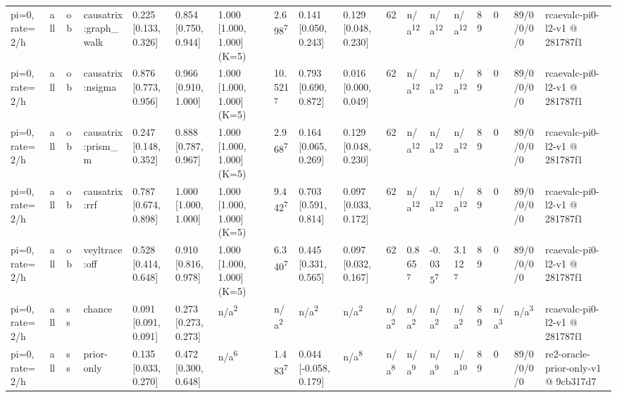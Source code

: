 \begin{table}[t]
\begin{tabular}{llllllllllllllllll}
pi=0, rate=2/h & all & ob & causatrix:graph\_walk & 0.225 [0.133, 0.326] & 0.854 [0.750, 0.944] & 1.000 [1.000, 1.000] (K=5) & 2.698\textsuperscript{7} & 0.141 [0.050, 0.243] & 0.129 [0.048, 0.230] & 62 & n/a\textsuperscript{12} & n/a\textsuperscript{12} & n/a\textsuperscript{12} & 89 & 0 & 89/0/0/0/0 & rcaevalc-pi0-l2-v1 @ 281787f1 \\
pi=0, rate=2/h & all & ob & causatrix:nsigma & 0.876 [0.773, 0.956] & 0.966 [0.910, 1.000] & 1.000 [1.000, 1.000] (K=5) & 10.521\textsuperscript{7} & 0.793 [0.690, 0.872] & 0.016 [0.000, 0.049] & 62 & n/a\textsuperscript{12} & n/a\textsuperscript{12} & n/a\textsuperscript{12} & 89 & 0 & 89/0/0/0/0 & rcaevalc-pi0-l2-v1 @ 281787f1 \\
pi=0, rate=2/h & all & ob & causatrix:prism\_m & 0.247 [0.148, 0.352] & 0.888 [0.787, 0.967] & 1.000 [1.000, 1.000] (K=5) & 2.968\textsuperscript{7} & 0.164 [0.065, 0.269] & 0.129 [0.048, 0.230] & 62 & n/a\textsuperscript{12} & n/a\textsuperscript{12} & n/a\textsuperscript{12} & 89 & 0 & 89/0/0/0/0 & rcaevalc-pi0-l2-v1 @ 281787f1 \\
pi=0, rate=2/h & all & ob & causatrix:rrf & 0.787 [0.674, 0.898] & 1.000 [1.000, 1.000] & 1.000 [1.000, 1.000] (K=5) & 9.442\textsuperscript{7} & 0.703 [0.591, 0.814] & 0.097 [0.033, 0.172] & 62 & n/a\textsuperscript{12} & n/a\textsuperscript{12} & n/a\textsuperscript{12} & 89 & 0 & 89/0/0/0/0 & rcaevalc-pi0-l2-v1 @ 281787f1 \\
pi=0, rate=2/h & all & ob & veyltrace:off & 0.528 [0.414, 0.648] & 0.910 [0.816, 0.978] & 1.000 [1.000, 1.000] (K=5) & 6.340\textsuperscript{7} & 0.445 [0.331, 0.565] & 0.097 [0.032, 0.167] & 62 & 0.865\textsuperscript{7} & -0.035\textsuperscript{7} & 3.112\textsuperscript{7} & 89 & 0 & 89/0/0/0/0 & rcaevalc-pi0-l2-v1 @ 281787f1 \\
pi=0, rate=2/h & all & ss & chance & 0.091 [0.091, 0.091] & 0.273 [0.273, 0.273] & n/a\textsuperscript{2} & n/a\textsuperscript{2} & n/a\textsuperscript{2} & n/a\textsuperscript{2} & n/a\textsuperscript{2} & n/a\textsuperscript{2} & n/a\textsuperscript{2} & n/a\textsuperscript{2} & 89 & n/a\textsuperscript{3} & n/a\textsuperscript{3} & rcaevalc-pi0-l2-v1 @ 281787f1 \\
pi=0, rate=2/h & all & ss & prior-only & 0.135 [0.033, 0.270] & 0.472 [0.300, 0.648] & n/a\textsuperscript{6} & 1.483\textsuperscript{7} & 0.044 [-0.058, 0.179] & n/a\textsuperscript{8} & n/a\textsuperscript{8} & n/a\textsuperscript{9} & n/a\textsuperscript{9} & n/a\textsuperscript{10} & 89 & 0 & 89/0/0/0/0 & re2-oracle-prior-only-v1 @ 9cb317d7 \\

\end{tabular}
\end{table}

